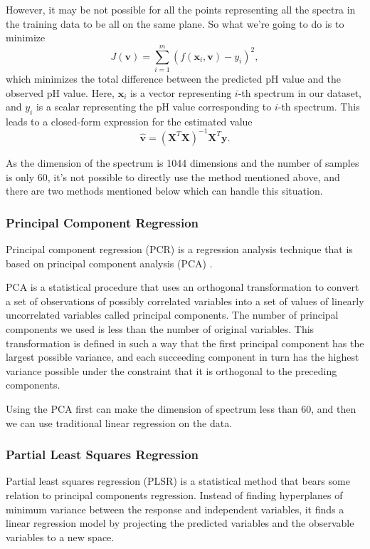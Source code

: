 \documentclass[a4paper]{article}
\newcommand{\bfv}{\mathbf{v}}
\newcommand{\bfx}{\mathbf{x}}
\begin{document}
However, it may be not possible for all the points representing all the spectra in the training data to be all on the same plane. So what we're going to do is to minimize
\begin{equation}
J(\bfv)=\sum_{i=1}^m (f(\bfx_i,\bfv)-y_i)^2,
\end{equation}
which minimizes the total difference between the predicted pH value and the observed pH value. Here, $\bfx_i$ is a vector representing $i$-th spectrum in our dataset, and $y_i$ is a scalar representing the pH value corresponding to $i$-th spectrum. This leads to a closed-form expression for the estimated value
\begin{equation}
\hat{\bfv}=(\mathbf{X}^T\mathbf{X})^{-1}\mathbf{X}^T\mathbf{y}.
\end{equation}

As the dimension of the spectrum is 1044 dimensions and the number of samples is only 60, it's not possible to directly use the method mentioned above, and there are two methods mentioned below which can handle this situation.
\subsubsection{Principal Component Regression}
Principal component regression (PCR) is a regression analysis technique that is based on principal component analysis (PCA) \cite{jolliffe2005principal}. 

PCA is a statistical procedure that uses an orthogonal transformation to convert a set of observations of possibly correlated variables into a set of values of linearly uncorrelated variables called principal components. The number of principal components we used is less than the number of original variables. This transformation is defined in such a way that the first principal component has the largest possible variance, and each succeeding component in turn has the highest variance possible under the constraint that it is orthogonal to the preceding components.

Using the PCA first can make the dimension of spectrum less than 60, and then we can use traditional linear regression on the data.
\subsubsection{Partial Least Squares Regression}
Partial least squares regression (PLSR) \cite{geladi1986partial} is a statistical method that bears some relation to principal components regression. Instead of finding hyperplanes of minimum variance between the response and independent variables, it finds a linear regression model by projecting the predicted variables and the observable variables to a new space.
\end{document}
